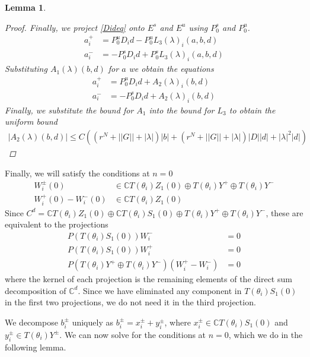 \documentclass[12pt]{article}
\def\C{{\mathbb C}}
\newtheorem{lemma}{Lemma}
\begin{document}
\begin{lemma}
\begin{proof}
Finally, we project \eqref{Dideq} onto $E^s$ and $E^u$ using $P_0^s$ and $P_0^u$.
\begin{align*}
a_i^+ &= P_0^u D_i d - P_0^u L_3(\lambda)_i(a,b,d) \\
a_i^- &= -P_0^s D_i d + P_0^s L_3(\lambda)_i(a,b,d)
\end{align*}
Substituting $A_1(\lambda)(b,d)$ for $a$ we obtain the equations
\begin{align*}
a_i^+ &= P_0^u D_i d + A_2(\lambda)_i(b,d) \\
a_i^- &= -P_0^s D_i d + A_2(\lambda)_i(b,d)
\end{align*}
Finally, we substitute the bound for $A_1$ into the bound for $L_3$ to obtain the uniform bound
\begin{align*}
|A_2(\lambda)(b,d)| \leq 
C\left( (r^N + ||G|| + |\lambda| )|b| + (r^N + ||G|| + |\lambda|)|D||d| + |\lambda|^2 |d|  \right)
\end{align*}
\end{proof}
\end{lemma}

Finally, we will satisfy the conditions at $n = 0$
\begin{align*}
W_i^\pm(0) &\in \C T(\theta_i) Z_1(0) \oplus T(\theta_i) Y^+ \oplus T(\theta_i) Y^- \\
W_i^+(0) - W_i^-(0) &\in \C T(\theta_i) Z_1(0)
\end{align*}
Since $C^d = \C T(\theta_i) Z_1(0) \oplus \C T(\theta_i) S_1(0) \oplus T(\theta_i) Y^+ \oplus T(\theta_i) Y^-$, these are equivalent to the projections
\begin{equation}\label{projeq}
\begin{aligned}
P(T(\theta_i) S_1(0)) W_i^- &= 0 \\
P(T(\theta_i) S_1(0)) W_i^+ &= 0 \\
P(T(\theta_i) Y^+ \oplus T(\theta_i) Y^-) (W_i^+ - W_i^-) &= 0
\end{aligned}
\end{equation}
where the kernel of each projection is the remaining elements of the direct sum decomposition of $\C^d$. Since we have eliminated any component in $T(\theta_i) S_1(0)$ in the first two projections, we do not need it in the third projection.

We decompose $b_i^\pm$ uniquely as $b_i^\pm = x_i^\pm + y_i^\pm$, where $x_i^\pm \in \C T(\theta_i) S_1(0)$ and $y_i^\pm \in T(\theta_i) Y^\pm$. We can now solve for the conditions at $n = 0$, which we do in the following lemma.
\end{document}
